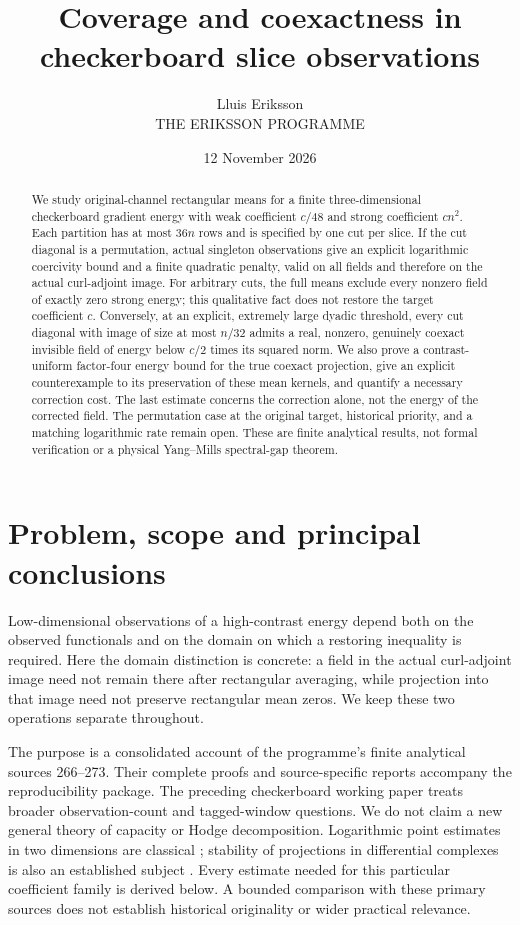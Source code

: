 \documentclass[11pt,a4paper]{article}
\title{Coverage and coexactness in checkerboard slice observations}
\author{Lluis Eriksson\\\small THE ERIKSSON PROGRAMME}
\date{12 November 2026}
\begin{document}
\maketitle
\begin{abstract}
We study original-channel rectangular means for a finite three-dimensional
checkerboard gradient energy with weak coefficient $c/48$ and strong coefficient
$cn^2$. Each partition has at most $36n$ rows and is specified by one cut per
slice. If the cut diagonal is a permutation, actual singleton observations give
an explicit logarithmic coercivity bound and a finite quadratic penalty, valid
on all fields and therefore on the actual curl-adjoint image. For arbitrary
cuts, the full means exclude every nonzero field of exactly zero strong energy;
this qualitative fact does not restore the target coefficient $c$. Conversely,
at an explicit, extremely large dyadic threshold, every cut diagonal with image
of size at most $n/32$ admits a real, nonzero, genuinely coexact invisible field
of energy below $c/2$ times its squared norm. We also prove a contrast-uniform
factor-four energy bound for the true coexact projection, give an explicit
counterexample to its preservation of these mean kernels, and quantify a
necessary correction cost. The last estimate concerns the correction alone,
not the energy of the corrected field. The permutation case at the original
target, historical priority, and a matching logarithmic rate remain open.
These are finite analytical results, not formal verification or a physical
Yang--Mills spectral-gap theorem.
\end{abstract}

\section{Problem, scope and principal conclusions}
Low-dimensional observations of a high-contrast energy depend both on the
observed functionals and on the domain on which a restoring inequality is
required. Here the domain distinction is concrete: a field in the actual
curl-adjoint image need not remain there after rectangular averaging, while
projection into that image need not preserve rectangular mean zeros. We keep
these two operations separate throughout.

The purpose is a consolidated account of the programme's finite analytical
sources 266--273. Their complete proofs and source-specific reports accompany
the reproducibility package. The preceding checkerboard working paper
\cite{previous} treats broader observation-count and tagged-window questions.
We do not claim a new general theory of capacity or Hodge decomposition.
Logarithmic point estimates in two dimensions are classical
\cite{lawler}; stability of projections in differential complexes is also an
established subject \cite{afw}. Every estimate needed for this particular
coefficient family is derived below. A bounded comparison with these primary
sources does not establish historical originality or wider practical relevance.
\end{document}
